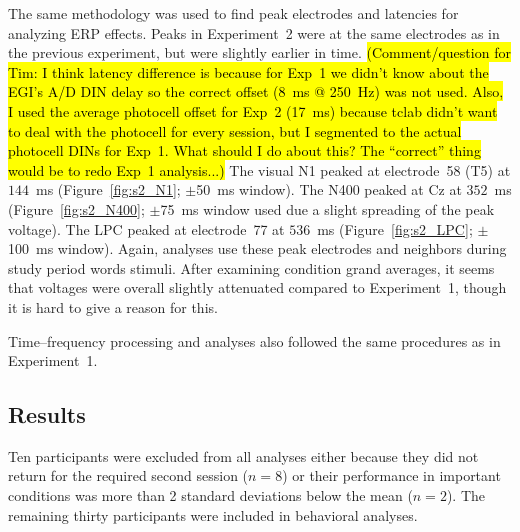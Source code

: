 The same methodology was used to find peak electrodes and latencies for analyzing ERP effects.  Peaks in Experiment~2 were at the same electrodes as in the previous experiment, but were slightly earlier in time. \hl{(Comment/question for Tim: I think latency difference is because for Exp~1 we didn't know about the EGI's A/D DIN delay so the correct offset (8~ms @ 250~Hz) was not used. Also, I used the average photocell offset for Exp~2 (17~ms) because tclab didn't want to deal with the photocell for every session, but I segmented to the actual photocell DINs for Exp~1. What should I do about this? The ``correct'' thing would be to redo Exp~1 analysis...)}
The visual N1 peaked at electrode~58 (T5) at $144$~ms (Figure~\ref{fig:s2_N1}; $\pm$50~ms window).  The N400 peaked at Cz at $352$~ms (Figure~\ref{fig:s2_N400}; $\pm$75~ms window used due a slight spreading of the peak voltage).  The LPC peaked at electrode~77 at $536$~ms (Figure~\ref{fig:s2_LPC}; $\pm$100~ms window).  Again, analyses use these peak electrodes and neighbors during study period words stimuli.  After examining condition grand averages, it seems that voltages were overall slightly attenuated compared to Experiment~1, though it is hard to give a reason for this.

Time--frequency processing and analyses also followed the same procedures as in Experiment~1.

\subsection{Results}





Ten participants were excluded from all analyses either because they did not return for the required second session ($n=8$) or their performance in important conditions was more than 2 standard deviations below the mean ($n=2$).  The remaining thirty participants were included in behavioral analyses.

